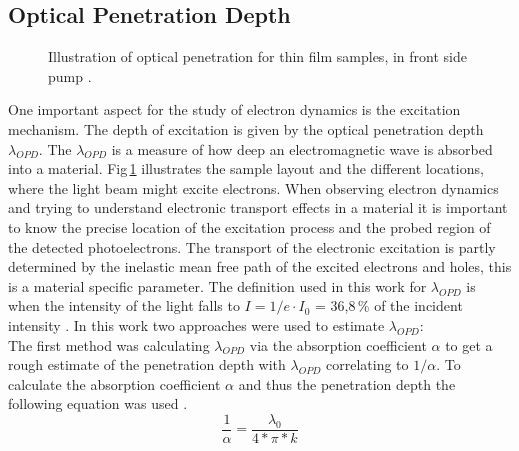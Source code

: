 \documentclass[a4paper,12pt,twoside]{article}
\begin{document}
        \subsection{Optical Penetration Depth}
            \label{OPDchap}
	\begin{figure}
		\caption{Illustration of optical penetration for thin film samples, in front side pump \cite{Kovacs2007}.}
		    \label{opticalpen}
	\end{figure}
One important aspect for the study of electron dynamics is the excitation mechanism. The depth of excitation is given by the optical penetration depth $\lambda_{OPD}$. The $\lambda_{OPD}$ is a measure of how deep an electromagnetic wave is absorbed into a material. Fig\,\ref{opticalpen} illustrates the sample layout and the different locations, where the light beam might excite electrons. When observing electron dynamics and trying to understand electronic transport effects in a material it is important to know the precise location of the excitation process and the probed region of the detected photoelectrons. The transport of the electronic excitation is partly determined by the inelastic mean free path of the excited electrons and holes, this is a material specific parameter. The definition used in this work for $\lambda_{OPD}$ is when the intensity of the light falls to $I=1/e \cdot I_{0}$ = 36,8\,\% of the incident intensity \cite{depth}. In this work two approaches were used to estimate $\lambda_{OPD}$:
\\
The first method was calculating $\lambda_{OPD}$ via the absorption coefficient $\alpha$ to get a rough estimate of the penetration depth with $\lambda_{OPD}$ correlating to $1/\alpha$. To calculate the absorption coefficient $\alpha$ and thus the penetration depth the following equation was used \cite{Powered2017}.
            \begin{equation}
                \label{absorptionkoef}
            \frac{ 1 }{ \alpha } = \frac{ \lambda_{ 0 } }{ 4*\pi*k }
            \end{equation}
\end{document}
